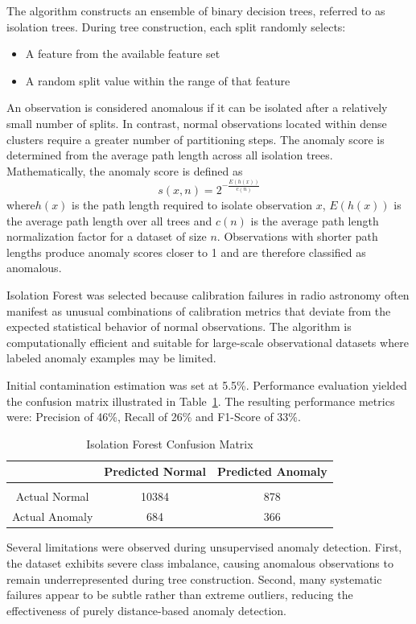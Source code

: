 \documentclass[linenumbers,trackchanges]{aastex701}
\begin{document}
The algorithm constructs an ensemble of binary decision trees, referred to as isolation trees. During tree construction, each split randomly selects:
\begin{itemize}
\item A feature from the available feature set
\item A random split value within the range of that feature
\end{itemize}
An observation is considered anomalous if it can be isolated after a relatively small number of splits. In contrast, normal observations located within dense clusters require a greater number of partitioning steps. The anomaly score is determined from the average path length across all isolation trees. Mathematically, the anomaly score is defined as
\begin{equation}
s(x,n)=2^{-\frac{E(h(x))}{c(n)}}
\end{equation}
where$h(x)$ is the path length required to isolate observation $x$, $E(h(x))$ is the average path length over all trees and $c(n)$ is the average path length normalization factor for a dataset of size $n$. Observations with shorter path lengths produce anomaly scores closer to 1 and are therefore classified as anomalous.

Isolation Forest was selected because calibration failures in radio astronomy often manifest as unusual combinations of calibration metrics that deviate from the expected statistical behavior of normal observations. The algorithm is computationally efficient and suitable for large-scale observational datasets where labeled anomaly examples may be limited.

Initial contamination estimation was set at 5.5\%. Performance evaluation yielded the confusion matrix illustrated in Table~\ref{tab:table1}. The resulting performance metrics were: Precision of 46\%, Recall	of 26\% and F1-Score of 33\%.

\begin{table}
\label{tab:table1}
\centering
\caption{Isolation Forest Confusion Matrix}
\begin{tabular}{ccc}
 & Predicted Normal & Predicted Anomaly \\
 \toprule \\
Actual Normal & 10384 & 878 \\
Actual Anomaly & 684 & 366 \\
\end{tabular}
\end{table}

Several limitations were observed during unsupervised anomaly detection.
First, the dataset exhibits severe class imbalance, causing anomalous observations to remain underrepresented during tree construction. Second, many systematic failures appear to be subtle rather than extreme outliers, reducing the effectiveness of purely distance-based anomaly detection.
\end{document}

